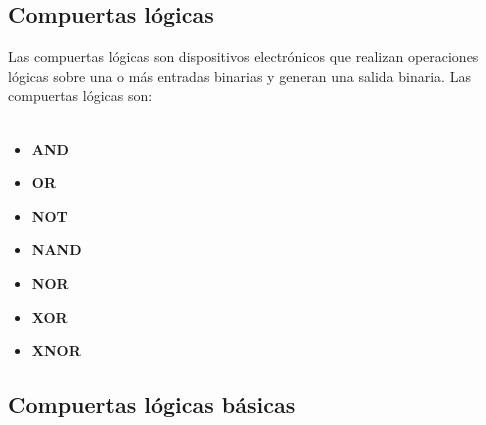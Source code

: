 \documentclass{templateNote}
\begin{document}
\subsection{Compuertas lógicas}
\noindent Las compuertas lógicas son dispositivos electrónicos que realizan operaciones lógicas sobre una o más entradas binarias y generan una salida binaria. Las compuertas lógicas son: \\\\
\begin{minipage}[t]{0.5\textwidth}
    \begin{center}
    \begin{itemize}
        \item \textbf{AND} 
        \item \textbf{OR} 
        \item \textbf{NOT}
        \item \textbf{NAND}
    \end{itemize}
    \end{center}
\end{minipage}%
\begin{minipage}[t]{0.5\textwidth}
    \begin{center}
    \begin{itemize}
        \item \textbf{NOR}
        \item \textbf{XOR}
        \item \textbf{XNOR}
    \end{itemize}
    \end{center}
\end{minipage}
\subsection{Compuertas lógicas básicas}
\end{document}
